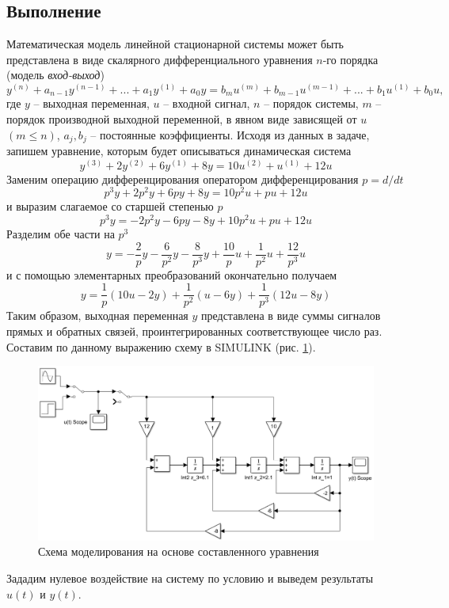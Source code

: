 \documentclass[a4paper, 12pt]{article}
\begin{document}
    \subsection{Выполнение}
    Математическая модель линейной стационарной системы может быть представлена в виде скалярного
    дифференциального уравнения $n$-го порядка (модель \textit{вход-выход})
    $$y^{(n)}+a_{n-1}y^{(n-1)}+...+a_1y^{(1)}+a_0y=b_mu^{(m)}+b_{m-1}u^{(m-1)}+...+b_1u^{(1)}+b_0u,$$
    где $y$ -- выходная переменная, $u$ -- входной сигнал, $n$ -- порядок системы, $m$ -- порядок производной
    выходной переменной, в явном виде зависящей от $u$ $(m\leq n)$, $a_j,b_j$ -- постоянные коэффициенты.
    Исходя из данных в задаче, запишем уравнение, которым будет описываться динамическая система
    $$y^{(3)}+2y^{(2)}+6y^{(1)}+8y=10u^{(2)}+u^{(1)}+12u$$
    Заменим операцию дифференцирования оператором дифференцирования $p=d/dt$
    $$p^3y+2p^2y+6py+8y=10p^2u+pu+12u$$
    и выразим слагаемое со старшей степенью $p$
    $$p^3y=-2p^2y-6py-8y+10p^2u+pu+12u$$
    Разделим обе части на $p^3$
    $$y=-\dfrac{2}{p}y-\dfrac{6}{p^2}y-\dfrac{8}{p^3}y+\dfrac{10}{p}u+\dfrac{1}{p^2}u+\dfrac{12}{p^3}u$$
    и с помощью элементарных преобразований окончательно получаем
    $$y=\dfrac{1}{p}\left(10u-2y\right)+\dfrac{1}{p^2}\left(u-6y\right)+\dfrac{1}{p^3}\left(12u-8y\right)$$
    Таким образом, выходная переменная $y$ представлена в виде суммы сигналов прямых и обратных связей,
    проинтегрированных соответствующее число раз. Составим по данному выражению схему в SIMULINK (рис. \ref{fig:scheme1}).
    \begin{figure}[H]
        \centering
        \includegraphics[scale=0.5]{scheme1.png}
        \captionsetup{skip=0pt}
        \caption{Схема моделирования на основе составленного уравнения}
        \label{fig:scheme1}
    \end{figure}
    Зададим нулевое воздействие на систему по условию и выведем результаты $u(t)$ и $y(t)$.
\end{document}
